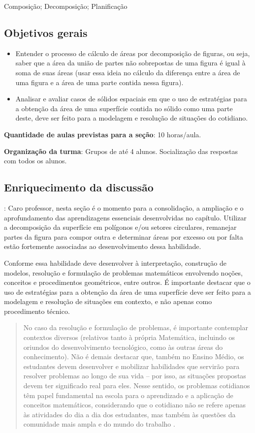 \begin{paginatexto}{Composição; Decomposição; Planificação}
{
\subsection{Objetivos gerais}
\begin{itemize}
\item Entender o processo de cálculo de áreas por decomposição de figuras, ou seja, saber que a área da união de partes não sobrepostas de uma figura é igual à soma de suas áreas (usar essa ideia no cálculo da diferença entre a área de uma figura e a área de uma parte contida nessa figura).
\item Analisar e avaliar casos de sólidos espaciais em que o uso de estratégias para a obtenção da área de uma superfície contida no sólido como uma parte deste, deve ser feito para a modelagem e resolução de situações do cotidiano.
\end{itemize}

\textbf{Quantidade de aulas previstas para a seção}: 10 horas/aula.

\textbf{Organização da turma}: Grupos de até 4 alunos. Socialização das respostas com todos os alunos.

\subsection{Enriquecimento da discussão}: Caro professor, nesta seção é o momento para a consolidação, a ampliação e o aprofundamento das aprendizagens essenciais desenvolvidas no capítulo. Utilizar a decomposição da superfície em polígonos e/ou setores circulares, remanejar partes da figura para compor outra e determinar áreas por excesso ou por falta estão fortemente associadas ao desenvolvimento dessa habilidade. 

Conforme \citet{BNCC2019} essa habilidade deve desenvolver à interpretação, construção de modelos, resolução e formulação de problemas matemáticos envolvendo noções, conceitos e procedimentos geométricos, entre outros. É importante destacar que o uso de estratégias para a obtenção da área de uma superfície deve ser feito para a modelagem e resolução de situações em contexto, e não apenas como procedimento técnico.

\begin{quote}
No caso da resolução e formulação de problemas, é importante contemplar contextos diversos (relativos tanto à própria Matemática, incluindo os oriundos do desenvolvimento tecnológico, como às outras áreas do conhecimento). Não é demais destacar que, também no Ensino Médio, os estudantes devem desenvolver e mobilizar habilidades que servirão para resolver problemas ao longo de sua vida – por isso, as situações propostas devem ter significado real para eles. Nesse sentido, os problemas cotidianos têm papel fundamental na escola para o aprendizado e a aplicação de conceitos matemáticos, considerando que o cotidiano não se refere apenas às atividades do dia a dia dos estudantes, mas também às questões da comunidade mais ampla e do mundo do trabalho \citep[p. 535]{BNCC2019}.
\end{quote}

}
\end{paginatexto}

